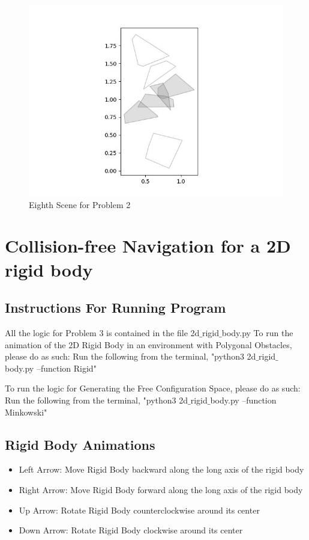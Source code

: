 \documentclass{article}
\begin{document}
\begin{figure}[h!]
	\includegraphics[width= 0.9 \linewidth]{Problem2_scene8.jpg}
	\centering
	\caption{Eighth Scene for Problem 2}
	\label{Problem2_scene8.jpg}
\end{figure}


 \newpage 
\section{Collision-free Navigation for a 2D rigid body}
\subsection{Instructions For Running Program}
All the logic for Problem 3 is contained in the file 2d$\_$rigid$\_$body.py \newline 
To run the animation of the 2D Rigid Body in an environment with Polygonal Obstacles, please do as such: \newline
Run the following from the terminal, "python3 2d$\_$rigid$\_$body.py --function Rigid" \newline 

To run the logic for Generating the Free Configuration Space, please do as such: \newline 
Run the following from the terminal, "python3 2d$\_$rigid$\_$body.py --function Minkowski"

\subsection{Rigid Body Animations}
\begin{itemize}
    \item Left Arrow: Move Rigid Body backward along the long axis of the rigid body
    \item Right Arrow: Move Rigid Body forward along the long axis of the rigid body
    \item Up Arrow: Rotate Rigid Body counterclockwise around its center
    \item Down Arrow: Rotate Rigid Body clockwise around its center
\end{itemize}
\end{document}
